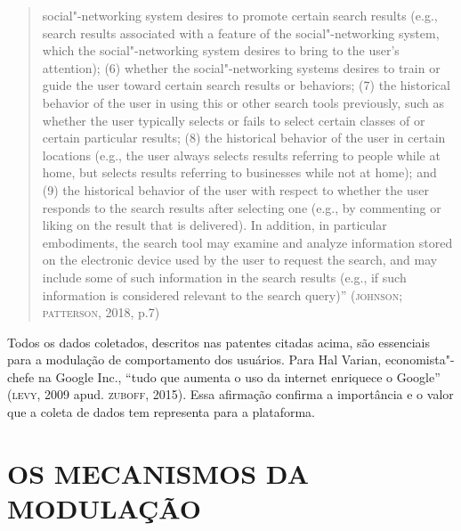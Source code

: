 \begin{quote}
{  social"-networking system desires to promote certain search results
  (e.g., search results associated with a feature of the
  social"-networking system, which the social"-networking system desires
  to bring to the user's attention); (6) whether the social"-networking
  systems desires to train or guide the user toward certain search
  results or behaviors; (7) the historical behavior of the user in using
  this or other search tools previously, such as whether the user
  typically selects or fails to select certain classes of or certain
  particular results; (8) the historical behavior of the user in certain
  locations (e.g., the user always selects results referring to people
  while at home, but selects results referring to businesses while not
  at home); and (9) the historical behavior of the user with respect to
  whether the user responds to the search results after selecting one
  (e.g., by commenting or liking on the result that is delivered). In
  addition, in particular embodiments, the search tool may examine and
  analyze information stored on the electronic device used by the user
  to request the search, and may include some of such information in the
  search results (e.g., if such information is considered relevant to
  the search query)''} (\textsc{johnson; patterson}, 2018, p.7)
\end{quote}

Todos os dados coletados, descritos nas patentes citadas acima, são
essenciais para a modulação de comportamento dos usuários. Para Hal
Varian, economista"-chefe na Google Inc., ``tudo que aumenta o uso da
internet enriquece o Google'' (\textsc{levy}, 2009 apud. \textsc{zuboff}, 2015). Essa
afirmação confirma a importância e o valor que a coleta de dados tem
representa para a plataforma.

\section{OS MECANISMOS DA MODULAÇÃO}

